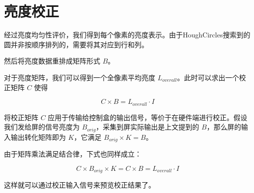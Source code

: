 \section{亮度校正} %
\label{sec:correction}

经过亮度均匀性评价，我们得到每个像素的亮度表示。由于HoughCircles搜索到的圆并非按顺序排列的，需要将其对应到行和列。

然后将亮度数据重排成矩阵形式 $B$。

对于亮度矩阵，我们可以得到一个全像素平均亮度 $L_{overall}$。此时可以求出一个校正矩阵 $C$ 使得

\begin{equation}
    C \times B = L_{overall} \cdot I
\end{equation}

将校正矩阵 $C$ 应用于传输给控制盒的输出信号，等价于在硬件端进行校正。假设我们发给屏的信号亮度为 $B_{orig}$，采集到屏实际输出是上文提到的 $B$，那么屏的输入输出转化矩阵即为 $K$，它满足 $B_{orig} \times K = B$。

由于矩阵乘法满足结合律，下式也同样成立：

\begin{equation}
    C \times B_{orig} \times K = C \times B = L_{overall} \cdot I
\end{equation}

这样就可以通过校正输入信号来预览校正结果了。

